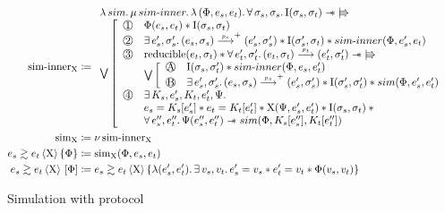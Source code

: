 \begin{figure}[tp]
    \begin{align*}
    		\mathrm{sim \mathhyphen inner}_\Chi
    		&\coloneqq
    		\begin{array}{l}
    				\lambdaAbs sim \ldotp
    				\muAbs sim \mathhyphen inner \ldotp
    				\lambdaAbs{(\Phi, e_s, e_t)} \ldotp
    				\forall \sigma_s, \sigma_s \ldotp
    				\mathrm{I} (\sigma_s, \sigma_t)
    				\iSepImp \iBupd
    			\\
    				\bigvee \left[ \begin{array}{ll}
    							\circled{1}
    						&
    							\Phi (e_s, e_t) \iSep \mathrm{I} (\sigma_s, \sigma_t)
    					\\
    							\circled{2}
    						&
    							\exists e_s', \sigma_s' \ldotp
    							(e_s, \sigma_s) \step{p_s}^+ (e_s', \sigma_s') \iSep
    							\mathrm{I} (\sigma_s', \sigma_t) \iSep
    							sim \mathhyphen inner (\Phi, e_s', e_t)
    					\\
    							\circled{3}
    						&
								\mathrm{reducible} (e_t, \sigma_t) \iSep
								\forall e_t', \sigma_t' \ldotp
								(e_t, \sigma_t) \step{p_t} (e_t', \sigma_t')
								\iSepImp \iBupd
						\\
                            &
								\bigvee \left[ \begin{array}{ll}
											\circled{A}
										&
											\mathrm{I} (\sigma_s, \sigma_t') \iSep
											sim \mathhyphen inner (\Phi, e_s, e_t')
									\\
											\circled{B}
										&
											\exists e_s', \sigma_s' \ldotp
											(e_s, \sigma_s) \step{p_s}^+ (e_s', \sigma_s') \iSep
											\mathrm{I} (\sigma_s', \sigma_t') \iSep
											sim (\Phi, e_s', e_t')
								\end{array} \right.
    					\\
    							\circled{4}
    						&
    							\exists K_s, e_s', K_t, e_t', \Psi \ldotp
    					\\
    					    &
    					        e_s = K_s [e_s'] \iSep
    							e_t = K_t [e_t'] \iSep
    						    \Chi (\Psi, e_s', e_t') \iSep
    						    \mathrm{I} (\sigma_s, \sigma_t) \iSep {}
    					\\
                            &
								\forall e_s'', e_t'' \ldotp
								\Psi (e_s'', e_t'') \iSepImp
								sim (\Phi, K_s [e_s''], K_t [e_t''])
    				\end{array} \right.
    		\end{array}
    	\\
    		\mathrm{sim}_\Chi
    		&\coloneqq
    		\nuAbs{\mathrm{sim \mathhyphen inner}_\Chi}
    	\\
    		\iSim[\Chi]{\Phi}{e_s}{e_t}
    		&\coloneqq
    		\mathrm{sim}_\Chi (\Phi, e_s, e_t)
    	\\
    	   \iSimv[\Chi]{\Phi}{e_s}{e_t}
    	   &\coloneqq
    	   \iSim[\Chi]{\lambdaAbs (e_s', e_t') \ldotp \exists v_s, v_t \ldotp e_s' = v_s \iSep e_t' = v_t \iSep \Phi (v_s, v_t)}{e_s}{e_t}
    \end{align*}
    \caption{Simulation with protocol}
    \label{fig:sim}
\end{figure}